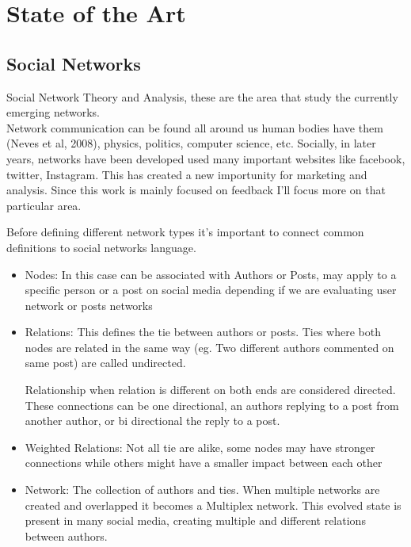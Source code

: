 \chapter{State of the Art}
\label{cha:SotA}


\section{Social Networks}
\label{sec:SocialNet}

\par
Social Network Theory and Analysis, these are the area that study the currently emerging networks. \\
Network communication can be found all around us human bodies have them (Neves et al, 2008), physics, politics, computer science, etc. Socially, in later years, networks have been developed used many important websites like facebook, twitter, Instagram. This has created a new importunity for marketing and analysis. 
Since this work is mainly focused on feedback I’ll focus more on that particular area.

\par
Before defining different network types it's important to connect common definitions to social networks language.

\begin{itemize}
	\item Nodes: In this case can be associated with Authors or Posts, may apply to a specific person or a post on social media depending if we are evaluating user network or posts networks
	
	\item Relations: This defines the tie between authors or posts. Ties where both nodes are related in the same way (eg. Two different authors commented on same post) are called undirected.
	
	\par Relationship when relation is different on both ends are considered directed. These connections can be one directional, an authors replying to a post from another author, or bi directional the reply to a post.
	
	\item Weighted Relations: Not all tie are alike, some nodes may have stronger connections while others might have a smaller impact between each other
	 
	\item Network: The collection of authors and ties. When multiple networks are created and overlapped it becomes a Multiplex network. This evolved state is present in many social media, creating multiple and different relations between authors.
	
\end{itemize} 

